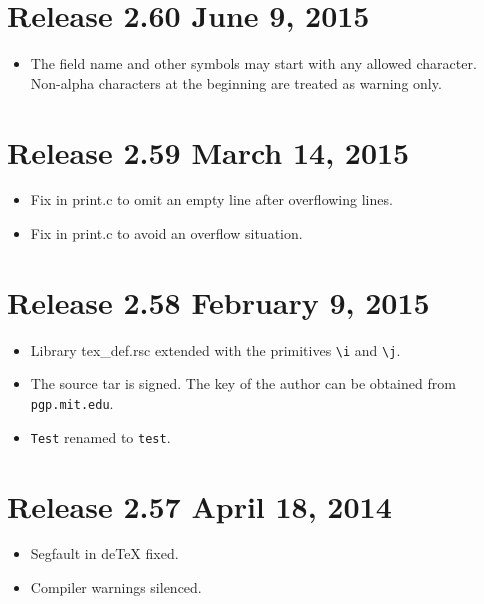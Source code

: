\documentclass[11pt,a4paper]{scrartcl}
\newcommand\File[1]{\textsf{#1}}
\newenvironment{Release}[2]{%
  \def\tmp{#2}%
  \section*{Release #1 \ifx\tmp\empty\else{\normalsize[#2]}\fi}
  \begin{itemize}
}{\end{itemize}}
\newenvironment{Fix}[1]{\item }{}
\newenvironment{Update}[1]{\item }{}
\begin{document}
\begin{multicols}
 \begin{Release}{2.60}{June 9, 2015}
  \begin{Fix}{gene}
    The field name and other symbols may start with any allowed
    character. Non-alpha characters at the beginning are treated as
    warning only.
  \end{Fix}
 \end{Release}

 \begin{Release}{2.59}{March 14, 2015}
  \begin{Fix}{gene}
    Fix in \File{print.c} to omit an empty line after overflowing lines.
  \end{Fix}
  \begin{Fix}{gene}
    Fix in \File{print.c} to avoid an overflow situation.
  \end{Fix}
 \end{Release}

 \begin{Release}{2.58}{February 9, 2015}
  \begin{Update}{gene}
    Library \File{tex\_def.rsc} extended with the primitives \verb|\i| and
    \verb|\j|.
  \end{Update}
  \begin{Update}{gene}
    The source tar is signed. The key of the author can be obtained
    from \texttt{pgp.mit.edu}.
  \end{Update}
  \begin{Update}{gene}
    \texttt{Test} renamed to \texttt{test}.
  \end{Update}
 \end{Release}

 \begin{Release}{2.57}{April 18, 2014}
  \begin{Fix}{gene}
    Segfault in deTeX fixed.
  \end{Fix}
  \begin{Fix}{gene}
    Compiler warnings silenced.
  \end{Fix}
 \end{Release}


\end{multicols}
\end{document}
